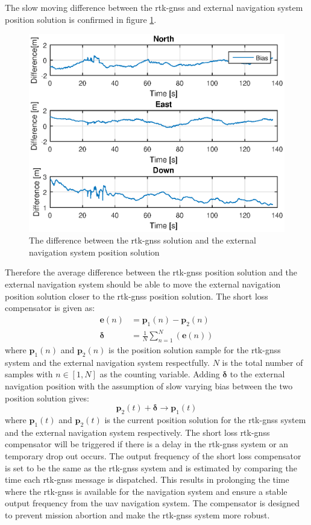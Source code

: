 The slow moving difference between the \gls{rtk-gnss} and external navigation system position solution is confirmed in figure \ref{Fig:RtkExtDiff}.
\begin{figure}[H]
\centering
\includegraphics[scale=0.8]{figs/Experiment/biasShow.eps}
\caption{The difference between the \gls{rtk-gnss} solution and the external navigation system position solution}
\label{Fig:RtkExtDiff}
\end{figure}
Therefore the average difference between the \gls{rtk-gnss} position solution and the external navigation system should be able to move the external navigation position solution closer to the \gls{rtk-gnss} position solution. The short loss compensator is given as:
\begin{align}
\mathbf{e}(n) &= \mathbf{p}_1(n) - \mathbf{p}_2(n)\\
\mathbf{\delta} &= \frac{1}{N}\sum_{n=1}^N(\mathbf{e}(n))
\end{align}
where $\mathbf{p}_1(n)$ and $\mathbf{p}_2(n)$ is the position solution sample for the \gls{rtk-gnss} system and the external navigation system respectfully. $N$ is the total number of samples with $n\in [1,N]$ as the counting variable. Adding $\mathbf{\delta}$ to the external navigation position with the assumption of slow varying bias between the two position solution gives:
\begin{equation}
\mathbf{p}_2(t) + \mathbf{\delta} \rightarrow \mathbf{p}_1(t)
\end{equation}
where $\mathbf{p}_1(t)$ and $\mathbf{p}_2(t)$ is the current position solution for the \gls{rtk-gnss} system and the external navigation system respectively. The short loss \gls{rtk-gnss} compensator will be triggered if there is a delay in the \gls{rtk-gnss} system or an temporary drop out occurs. The output frequency of the short loss compensator is set to be the same as the \gls{rtk-gnss} system and is estimated by comparing the time each \gls{rtk-gnss} message is dispatched. This results in prolonging the time where the \gls{rtk-gnss} is available for the navigation system and ensure a stable output frequency from the \gls{uav} navigation system. The compensator is designed to prevent mission abortion and make the \gls{rtk-gnss} system more robust.
